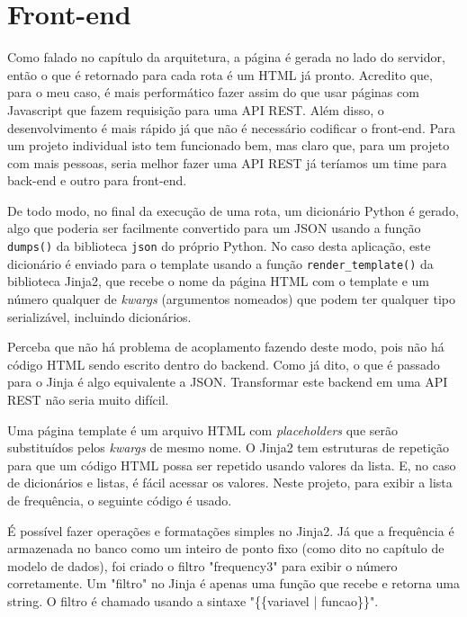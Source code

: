 \chapter{Front-end}

Como falado no capítulo da arquitetura, a página é gerada no lado do servidor, então o que 
é retornado para cada rota é um HTML já pronto. Acredito que, para o meu caso, é mais 
performático fazer assim do que usar páginas com Javascript que fazem requisição para uma API REST.
Além disso, o desenvolvimento é mais rápido já que não é necessário codificar o front-end.
Para um projeto individual isto tem funcionado bem, mas claro que, para um projeto com
mais pessoas, seria melhor fazer uma API REST já teríamos um time para back-end e outro
para front-end.

De todo modo, no final da execução de uma rota, um dicionário Python é gerado, algo que 
poderia ser facilmente convertido para um JSON usando a função \texttt{dumps()} da 
biblioteca \texttt{json} do próprio Python. No caso desta aplicação, este dicionário é 
enviado para o template usando a função \texttt{render\_template()} da biblioteca Jinja2, 
que recebe o nome da página HTML com o template e um número qualquer de \textit{kwargs} (argumentos nomeados) 
que podem ter qualquer tipo serializável, incluindo dicionários.

Perceba que não há problema de acoplamento fazendo deste modo, pois não há código HTML sendo 
escrito dentro do backend. Como já dito, o que é passado para o Jinja é algo equivalente a JSON.
Transformar este backend em uma API REST não seria muito difícil.

Uma página template é um arquivo HTML com \textit{placeholders} que serão substituídos pelos 
\textit{kwargs} de mesmo nome. O Jinja2 tem estruturas de repetição para que um código HTML 
possa ser repetido usando valores da lista. E, no caso de dicionários e listas, é fácil acessar 
os valores. Neste projeto, para exibir a lista de frequência, o seguinte código é usado.



É possível fazer operações e formatações simples no Jinja2. Já que a frequência 
é armazenada no banco como um inteiro de ponto fixo (como dito no capítulo de modelo de dados), 
foi criado o filtro "frequency3" para exibir o número corretamente. Um "filtro" no Jinja 
é apenas uma função que recebe e retorna
uma string. O filtro é chamado usando a sintaxe "\{\{variavel | funcao\}\}".


